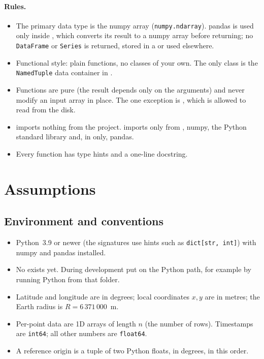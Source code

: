 \documentclass{article}
\begin{document}
\paragraph{Rules.}
\begin{itemize}
\item The primary data type is the numpy array (\texttt{numpy.ndarray}).
      pandas is used only inside , which converts its result
      to a numpy array before returning; no \texttt{DataFrame} or
      \texttt{Series} is returned, stored in a  or used
      elsewhere.
\item Functional style: plain functions, no classes of your own. The only
      class is the \texttt{NamedTuple} data container in .
\item Functions are pure (the result depends only on the arguments) and never
      modify an input array in place. The one exception is ,
      which is allowed to read from the disk.
\item {} imports nothing from the project.  imports
      only from , numpy, the Python standard library and, in
       only, pandas.
\item Every function has type hints and a one-line docstring.
\end{itemize}

\section{Assumptions}

\subsection{Environment and conventions}

\begin{itemize}
\item Python~3.9 or newer (the signatures use hints such as
      \texttt{dict[str, int]}) with numpy and pandas installed.
\item No  exists yet. During development put
       on the Python path, for example by running
      Python from that folder.
\item Latitude and longitude are in degrees; local coordinates $x,y$ are in
      metres; the Earth radius is $R = 6\,371\,000$~m.
\item Per-point data are 1D arrays of length $n$ (the number of rows).
      Timestamps are \texttt{int64}; all other numbers are \texttt{float64}.
\item A reference origin is a tuple  of two Python floats,
      in degrees, in this order.
\end{itemize}
\end{document}

